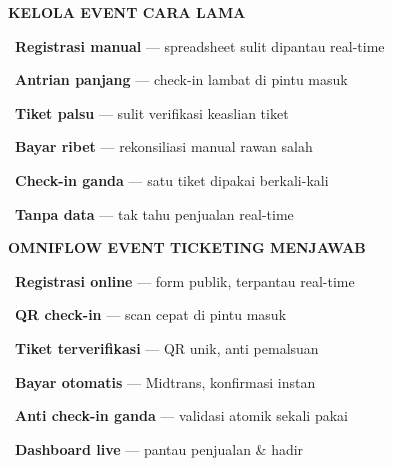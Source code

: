 \documentclass[a4paper]{article}
\begin{document}
\noindent
\begin{minipage}[t]{0.485\textwidth}
    \colorbox{RedLight}{%
        \begin{minipage}{\dimexpr\textwidth-2\fboxsep\relax}
            {\fontsize{10}{13}\selectfont\bfseries\color{RedText} KELOLA EVENT CARA LAMA}
        \end{minipage}}\par
    \vspace{4pt}

    {\fontsize{9.5}{13}\selectfont\color{TextDark}%
    \textbullet\ \textbf{Registrasi manual} --- spreadsheet sulit dipantau real-time\par\vspace{4pt}%
    \textbullet\ \textbf{Antrian panjang} --- check-in lambat di pintu masuk\par\vspace{4pt}%
    \textbullet\ \textbf{Tiket palsu} --- sulit verifikasi keaslian tiket\par\vspace{4pt}%
    \textbullet\ \textbf{Bayar ribet} --- rekonsiliasi manual rawan salah\par\vspace{4pt}%
    \textbullet\ \textbf{Check-in ganda} --- satu tiket dipakai berkali-kali\par\vspace{4pt}%
    \textbullet\ \textbf{Tanpa data} --- tak tahu penjualan real-time}%
\end{minipage}%
\hfill%
\begin{minipage}[t]{0.485\textwidth}
    \colorbox{BluePrimary}{%
        \begin{minipage}{\dimexpr\textwidth-2\fboxsep\relax}
            {\fontsize{10}{13}\selectfont\bfseries\color{White} OMNIFLOW EVENT TICKETING MENJAWAB}
        \end{minipage}}\par
    \vspace{4pt}

    {\fontsize{9.5}{13}\selectfont\color{TextDark}%
    \textbullet\ \textbf{Registrasi online} --- form publik, terpantau real-time\par\vspace{4pt}%
    \textbullet\ \textbf{QR check-in} --- scan cepat di pintu masuk\par\vspace{4pt}%
    \textbullet\ \textbf{Tiket terverifikasi} --- QR unik, anti pemalsuan\par\vspace{4pt}%
    \textbullet\ \textbf{Bayar otomatis} --- Midtrans, konfirmasi instan\par\vspace{4pt}%
    \textbullet\ \textbf{Anti check-in ganda} --- validasi atomik sekali pakai\par\vspace{4pt}%
    \textbullet\ \textbf{Dashboard live} --- pantau penjualan \& hadir}%
\end{minipage}
\end{document}
